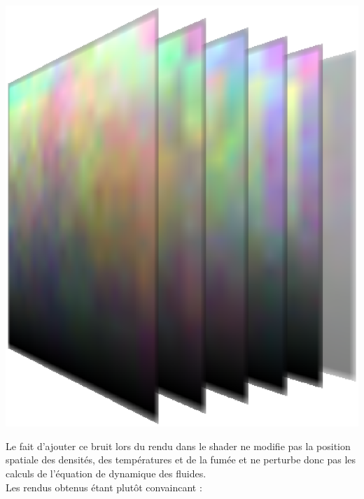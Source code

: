 \documentclass[a4paper,10pt]{article}
\begin{document}
\begin{center}
\includegraphics[scale=0.5]{Perlin3D.ps}
\end{center}

Le fait d'ajouter ce bruit lors du rendu dans le shader ne modifie pas la position spatiale des densités, des températures et de la fumée et ne perturbe donc pas les calculs de l'équation de dynamique des fluides.\\ 

Les rendus obtenus étant plutôt convaincant :\\
\end{document}
